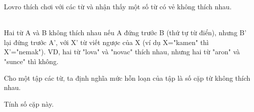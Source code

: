 Lovro thích chơi với các từ và nhận thấy một số từ có vẻ không thích nhau.


\\Hai từ A và B không thích nhau nếu A đứng trước B (thứ tự từ điển), nhưng B' lại đứng trước A', với X' từ viết ngược của X (ví dụ X="kamen" thì X'="nemak"). VD, hai từ "lova" và "novac" thích nhau, nhưng hai từ "aron" và "sunce" thì không.

Cho một tập các từ, ta định nghĩa mức hỗn loạn của tập là số cặp từ không thích nhau.

Tính số cặp này.